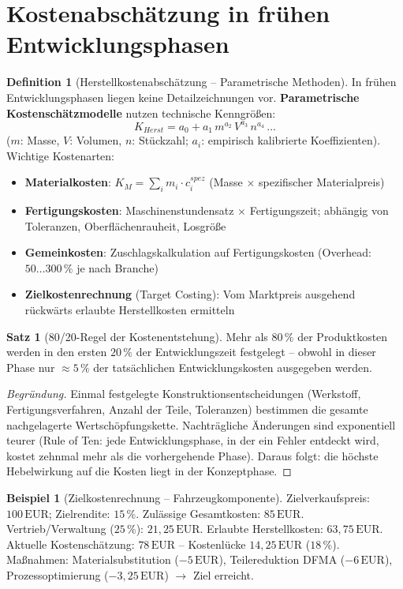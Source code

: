 ﻿\documentclass[a4paper,12pt]{report}
\theoremstyle{definition}
\newtheorem{definition}{Definition}
\newtheorem{beispiel}{Beispiel}
\newtheorem{satz}{Satz}
\begin{document}
\section{Kostenabschätzung in frühen Entwicklungsphasen}

\begin{definition}[Herstellkostenabschätzung -- Parametrische Methoden]
In frühen Entwicklungsphasen liegen keine Detailzeichnungen vor.
\textbf{Parametrische Kostenschätzmodelle} nutzen technische Kenngrößen:
\[
  K_{Herst} = a_0 + a_1\,m^{a_2}\,V^{a_3}\,n^{a_4}\,\ldots
\]
($m$: Masse, $V$: Volumen, $n$: Stückzahl; $a_i$: empirisch kalibrierte Koeffizienten).
Wichtige Kostenarten:
\begin{itemize}
    \item[-] \textbf{Materialkosten}: $K_M = \sum_i m_i \cdot c_i^{spez}$
          (Masse $\times$ spezifischer Materialpreis)
    \item[-] \textbf{Fertigungskosten}: Maschinenstundensatz $\times$ Fertigungszeit;
          abhängig von Toleranzen, Oberflächenrauheit, Losgröße
    \item[-] \textbf{Gemeinkosten}: Zuschlagskalkulation auf Fertigungskosten
          (Overhead: $50\ldots300\,\%$ je nach Branche)
    \item[-] \textbf{Zielkostenrechnung} (Target Costing): Vom Marktpreis
          ausgehend rückwärts erlaubte Herstellkosten ermitteln
\end{itemize}
\end{definition}

\begin{satz}[80/20-Regel der Kostenentstehung]
Mehr als $80\,\%$ der Produktkosten werden in den ersten $20\,\%$
der Entwicklungszeit festgelegt -- obwohl in dieser Phase nur
$\approx 5\,\%$ der tatsächlichen Entwicklungskosten ausgegeben werden.
\end{satz}
\begin{proof}[Begründung]
Einmal festgelegte Konstruktionsentscheidungen (Werkstoff, Fertigungsverfahren,
Anzahl der Teile, Toleranzen) bestimmen die gesamte nachgelagerte Wertschöpfungskette.
Nachträgliche Änderungen sind exponentiell teurer (Rule of Ten:
jede Entwicklungsphase, in der ein Fehler entdeckt wird, kostet zehnmal mehr
als die vorhergehende Phase). Daraus folgt: die höchste Hebelwirkung
auf die Kosten liegt in der Konzeptphase.
\end{proof}

\begin{beispiel}[Zielkostenrechnung -- Fahrzeugkomponente]
Zielverkaufspreis: $100\,\mathrm{EUR}$; Zielrendite: $15\,\%$.
Zulässige Gesamtkosten: $85\,\mathrm{EUR}$.
Vertrieb/Verwaltung ($25\,\%$): $21{,}25\,\mathrm{EUR}$.
Erlaubte Herstellkosten: $63{,}75\,\mathrm{EUR}$.
Aktuelle Kostenschätzung: $78\,\mathrm{EUR}$ -- Kostenlücke $14{,}25\,\mathrm{EUR}$ ($18\,\%$).
Maßnahmen: Materialsubstitution ($-5\,\mathrm{EUR}$), Teilereduktion DFMA ($-6\,\mathrm{EUR}$),
Prozessoptimierung ($-3{,}25\,\mathrm{EUR}$) $\to$ Ziel erreicht.
\end{beispiel}
\end{document}
